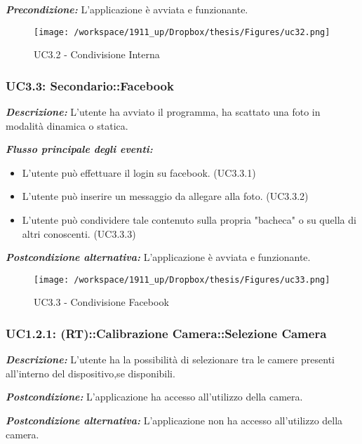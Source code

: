 \textbf{\textit{Precondizione:}} L'applicazione è avviata e funzionante.


\begin{figure}[H]\centering  
\texttt{[image: /workspace/1911\_up/Dropbox/thesis/Figures/uc32.png]}
\caption[UC3.2 - Condivisione Interna]{UC3.2 - Condivisione Interna}
\label{pic-a}
\end{figure}

\subsubsection{UC3.3: Secondario::Facebook}

\textbf{\textit{Descrizione:}} L'utente ha avviato il programma, ha scattato una foto in modalità dinamica o statica.

\textbf{\textit{Flusso principale degli eventi:}} 

\begin{itemize}
\item L'utente può effettuare il login su facebook. (UC3.3.1)
\item L'utente può inserire un messaggio da allegare alla foto. (UC3.3.2)
\item L'utente può condividere tale contenuto sulla propria "bacheca" o su quella di altri conoscenti. (UC3.3.3)
\end{itemize}

\textbf{\textit{Postcondizione alternativa:}} L'applicazione è avviata e funzionante.


\begin{figure}[H]\centering  
\texttt{[image: /workspace/1911\_up/Dropbox/thesis/Figures/uc33.png]}
\caption[UC3.3 - Condivisione Facebook]{UC3.3 - Condivisione Facebook}
\label{pic-a}
\end{figure}

\subsubsection{UC1.2.1: (RT)::Calibrazione Camera::Selezione Camera}

\textbf{\textit{Descrizione:}} L'utente ha la possibilità di selezionare tra le camere presenti all'interno del dispositivo,se disponibili. 

\textbf{\textit{Postcondizione:}} L'applicazione ha accesso all'utilizzo della camera.

\textbf{\textit{Postcondizione alternativa:}} L'applicazione non ha accesso all'utilizzo della camera.

